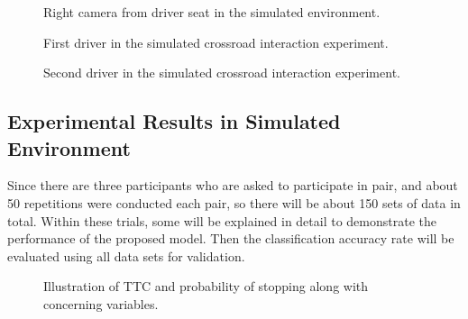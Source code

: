 \begin{figure}[htbp!]
\begin{center}
\end{center}
\caption{Right camera from driver seat in the simulated environment.}
\label{fig:RightCam} 
\end{figure}

\begin{figure}[htbp!]
\begin{center}
\end{center}
\caption{First driver in the simulated crossroad interaction experiment.}
\label{fig:Driver1} 
\end{figure}

\begin{figure}[htbp!]
\begin{center}
\end{center}
\caption{Second driver in the simulated crossroad interaction experiment.}
\label{fig:Driver2} 
\end{figure}

\subsection{Experimental Results in Simulated Environment}
\label{sub:ResultSim}

Since there are three participants who are asked to participate in pair, and about 50 repetitions were conducted each pair, so there will be about 150 sets of data in total. Within these trials, some will be explained in detail to demonstrate the performance of the proposed model. Then the classification accuracy rate will be evaluated using all data sets for validation.  

\begin{figure}[htbp!]
    \centering
    \hfill
    \hfill
    
    \caption{Illustration of TTC and probability of stopping along with concerning variables.} \label{fig:illustration}
\end{figure}

